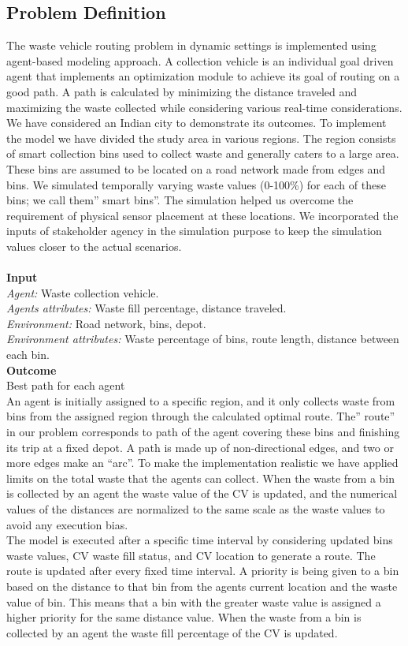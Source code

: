 \documentclass[12pt]{article}
\begin{document}
\subsection{Problem Definition}
The waste vehicle routing problem in dynamic settings is implemented using agent-based modeling approach. A collection vehicle is an individual goal driven agent that implements an optimization module to achieve its goal of routing on a good path. A path is calculated by minimizing the distance traveled and maximizing the waste collected while considering various real-time considerations. We have considered an Indian city to demonstrate its outcomes. To implement the model we have divided the study area in various regions. The region consists of smart collection bins used to collect waste and generally caters to a large area. These bins are assumed to be located on a road network made from edges and bins. We simulated temporally varying waste values (0-100\%) for each of these bins; we call them” smart bins”. The simulation helped us overcome the requirement of physical sensor placement at these locations. We incorporated the inputs of stakeholder agency in the simulation purpose to keep the simulation values closer to the actual scenarios.\\
\\
\textbf {Input}\\
\textit {Agent:} Waste collection vehicle.\\
\textit {Agents attributes:} Waste fill percentage, distance traveled.  \\
\textit {Environment:} Road network, bins, depot.  \\
\textit {Environment attributes:} Waste percentage of bins, route length, distance between each bin.\\
\textbf{Outcome}\\
Best path for each agent\\

An agent is initially assigned to a specific region, and it only collects waste from bins from the assigned region through the calculated optimal route. The” route” in our problem corresponds to path of the agent covering these bins and finishing its trip at a fixed depot. A path is made up of non-directional edges, and two or more edges make an “arc”. To make the implementation realistic we have applied limits on the total waste that the agents can collect. When the waste from a bin is collected by an agent the waste value of the CV is updated, and the numerical values of the distances are normalized to the same scale as the waste values to avoid any execution bias.\\ The model is executed after a specific time interval by considering updated bins waste values, CV waste fill status, and CV location to generate a route. The route is updated after every fixed time interval. A priority is being given to a bin based on the distance to that bin from the agents current location and the waste value of bin. This means that a bin with the greater waste value is assigned a higher priority for the same distance value. When the waste from a bin is collected by an agent the waste fill percentage of the CV is updated.\\ 
\end{document}
